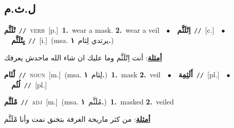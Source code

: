 \documentclass[10pt,a4paper,twoside]{article} %
\begin{document}
\begin{multicols}{2}
\vspace{-3mm}
\subsection*{\color{blue}\foreignlanguage{arabic}{ل.ث.م}\color{blue}{}} 

{\setlength\topsep{0pt}\textbf{\foreignlanguage{arabic}{تْلَثَّم}}\ {\color{gray}\texttt{//}\color{black}}\ \textsc{verb}\ [p.]\ \textbf{1.}~wear a mask.  \textbf{2.}~wear a veil\ \ $\bullet$\ \ \setlength\topsep{0pt}\textbf{\foreignlanguage{arabic}{اِتْلَثَّم}}\ {\color{gray}\texttt{//}\color{black}}\ [c.]\ \ $\bullet$\ \ \setlength\topsep{0pt}\textbf{\foreignlanguage{arabic}{يِتْلَثَّم}}\ {\color{gray}\texttt{//}\color{black}}\ [i.]\ \color{gray}(msa. \foreignlanguage{arabic}{يرتدي لِثام}~\foreignlanguage{arabic}{\textbf{١.}})\color{black}\  \begin{flushright}\color{gray}\foreignlanguage{arabic}{\textbf{\underline{\foreignlanguage{arabic}{أمثلة}}}: أنت اِتْلَثَّم وما عليك ان شاء الله ماحدش يعرفك}\end{flushright}\color{black}} \vspace{2mm}

{\setlength\topsep{0pt}\textbf{\foreignlanguage{arabic}{لْثَام}}\ {\color{gray}\texttt{//}\color{black}}\ \textsc{noun}\ [m.]\ \color{gray}(msa. \foreignlanguage{arabic}{لِثام}~\foreignlanguage{arabic}{\textbf{١.}})\color{black}\ \textbf{1.}~mask  \textbf{2.}~veil\ \ $\bullet$\ \ \setlength\topsep{0pt}\textbf{\foreignlanguage{arabic}{أَلَثِمِة}}\ {\color{gray}\texttt{//}\color{black}}\ [pl.]\ \ $\bullet$\ \ \setlength\topsep{0pt}\textbf{\foreignlanguage{arabic}{لُثُم}}\ {\color{gray}\texttt{//}\color{black}}\ [pl.]\ } \vspace{2mm}

{\setlength\topsep{0pt}\textbf{\foreignlanguage{arabic}{مْلَثَّم}}\ {\color{gray}\texttt{//}\color{black}}\ \textsc{adj}\ [m.]\ \color{gray}(msa. \foreignlanguage{arabic}{مُلَثَّم}~\foreignlanguage{arabic}{\textbf{١.}})\color{black}\ \textbf{1.}~masked  \textbf{2.}~veiled\  \begin{flushright}\color{gray}\foreignlanguage{arabic}{\textbf{\underline{\foreignlanguage{arabic}{أمثلة}}}: من كثر ماريحة الغرفة بتخنق نمت وأنا مْلَثَّم}\end{flushright}\color{black}} \vspace{2mm}


\end{multicols}
\end{document}

